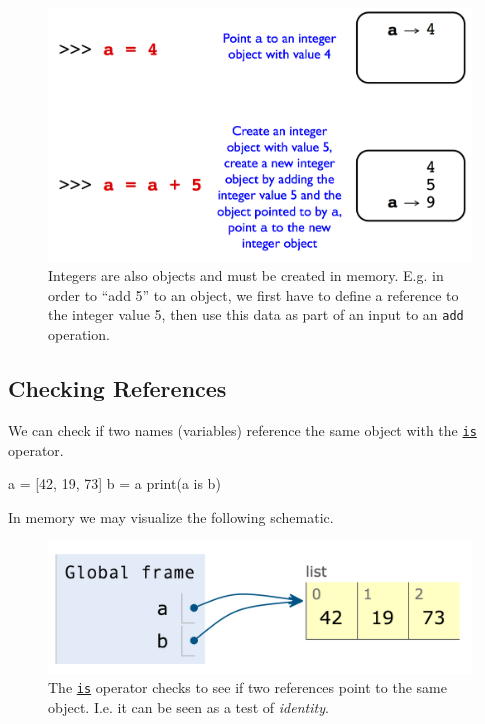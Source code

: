 \documentclass[12pt,letterpaper,twoside]{article}
\begin{document}
\begin{enumerate}
\begin{figure}[h]
\centering
\includegraphics[scale=0.35]{fig/references-example-2.png}
\caption{\small Integers are also objects and must be created in memory. E.g. in order to ``add 5'' to an object, 
we first have to define a reference to the integer value 5, then use this data as part of an input to an \texttt{add} operation.}
\end{figure}

\subsection{Checking References}
We can check if two names (variables) reference the same object with the
\href{https://docs.python.org/3/library/operator.html}{\texttt{is}} operator.

\begin{python}
a = [42, 19, 73]
b = a
print(a is b)
\end{python}

In memory we may visualize the following schematic.

\begin{figure}[h]
\centering
\includegraphics[scale=0.5]{fig/list-1.png}
\caption{The \href{https://docs.python.org/3/library/operator.html}{\texttt{is}} operator checks to see if two references point to the same object. I.e. it can be seen as a test of \emph{identity}.}
\end{figure}


\end{enumerate}
\end{document}
